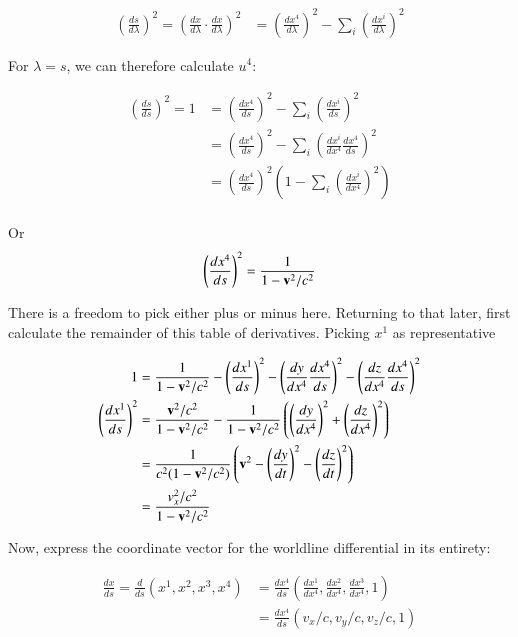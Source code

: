\begin{align*}
\left(\frac{ds}{d\lambda}\right)^2 = \left( \frac{dx}{d\lambda} \cdot \frac{dx}{d\lambda} \right)^2
&= \left(\frac{dx^4}{d\lambda}\right)^2 - \sum_i \left(\frac{dx^i}{d\lambda}\right)^2
\end{align*}

For $\lambda = s$, we can therefore calculate $u^4$:

\begin{align*}
\left(\frac{ds}{ds}\right)^2 = 1 
&= \left(\frac{dx^4}{ds}\right)^2 - \sum_i \left(\frac{dx^i}{ds}\right)^2 \\
&= \left(\frac{dx^4}{ds}\right)^2 - \sum_i \left( \frac{dx^i}{dx^4} \frac{dx^4}{ds} \right)^2 \\
&= \left(\frac{dx^4}{ds}\right)^2 \left( 1 - \sum_i \left( \frac{dx^i}{dx^4} \right)^2 \right) \\
\end{align*}

Or
\begin{align}\label{eqn:debroglie:timearc}
\left(\frac{dx^4}{ds}\right)^2 = \frac{1}{1 - \mathbf{v}^2/c^2 } \\
\end{align}

There is a freedom to pick either plus or minus here.  Returning to that later, first 
calculate the remainder of this table of derivatives.  Picking $x^1$ as representative

\begin{align*}
1 &= \frac{1}{1 - \mathbf{v}^2/c^2 } 
- \left(\frac{dx^1}{ds}\right)^2
- \left( \frac{dy}{dx^4} \frac{dx^4}{ds} \right)^2
- \left( \frac{dz}{dx^4} \frac{dx^4}{ds} \right)^2 \\
\left(\frac{dx^1}{ds}\right)^2
&= \frac{\mathbf{v}^2/c^2 }{1 - \mathbf{v}^2/c^2 } 
-\frac{1}{1 - \mathbf{v}^2/c^2 } \left( \left( \frac{dy}{dx^4} \right)^2 + \left( \frac{dz}{dx^4} \right)^2 \right) \\
&= \frac{1}{c^2 (1 - \mathbf{v}^2/c^2) } \left( \mathbf{v}^2 - \left( \frac{dy}{dt} \right)^2 - \left( \frac{dz}{dt} \right)^2 \right) \\
&= \frac{v_x^2/c^2}{1 - \mathbf{v}^2/c^2}
\end{align*}

Now, express the coordinate vector for the worldline differential in its entirety:

\begin{align*}
\frac{dx}{ds} =
\frac{d}{ds}(x^1, x^2, x^3, x^4)
&= \frac{dx^4}{ds} \left( \frac{dx^1}{dx^4}, \frac{dx^2}{dx^4}, \frac{dx^3}{dx^4}, 1 \right) \\
&= \frac{dx^4}{ds} ( v_x/c, v_y/c, v_z/c, 1) \\
\end{align*}

